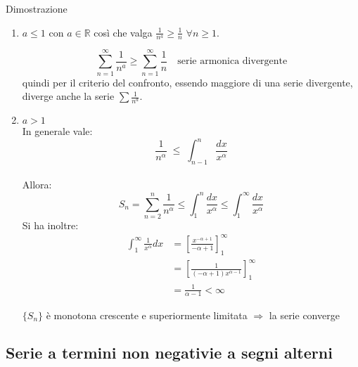 \documentclass[x11names]{article}
\begin{document}
	\begin{es}{Dimostrazione}
		\begin{enumerate}
			\item \(a\leq 1\) con \(a \in \mathbb{R}\) così che valga \(\frac{1}{n^a} \geq \frac{1}{n}\) \(\forall n \geq 1\).
			
			\[ 
			\sum_{n=1}^\infty\frac{1}{n^a} \geq \sum_{n=1}^\infty\frac{1}{n} \quad \text{serie armonica divergente}
			\]
			quindi per il criterio del confronto, essendo maggiore di una serie divergente, diverge anche la serie \(\sum\frac{1}{n^a}\). \\
			
			\item $a > 1$\\
			
			In generale vale:
			\[
			\frac{1}{n^{\alpha}} \; \leq \; \int_{n-1}^{n} \frac{dx}{x^{\alpha}}
			\] \\
			Allora: 
			\[
			S_n = \sum_{n=2}^{n} \frac{1}{n^{\alpha}} \leq \int_{1}^{n}\frac{dx}{x^{\alpha}} \leq\int_{1}^{\infty}\frac{dx}{x^{\alpha}}
			\]
			Si ha inoltre: 
			\begin{align*}
				\int_{1}^{\infty}\frac{1}{x^{\alpha}}dx &= \left[\frac{x^{-\alpha+1}}{-\alpha+1}\right]^{\infty}_{1}\\
				&=\left[\frac{1}{(-\alpha+1)x^{\alpha-1}}\right]^{\infty}_{1}\\
				&=\frac{1}{\alpha-1}<\infty
			\end{align*}
			
			$\{S_n\}$ è monotona crescente e superiormente limitata $\Longrightarrow$ la serie converge 
		\end{enumerate}
	\end{es}
	\subsection{Serie a termini non negativie a segni alterni}
	
\end{document}
